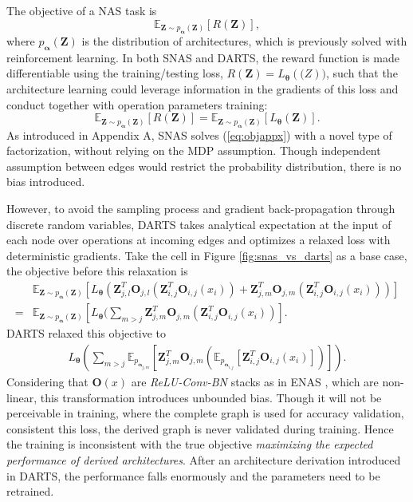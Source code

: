 \documentclass{article} \usepackage{iclr2019_conference,times}
\newcommand{\zh}{\color{black}}
\begin{document}
The objective of a NAS task is 
\begin{equation}
\label{eq:objappx}
\mathbb{E}_{\bm{Z}\sim p_{\bm{\alpha}}(\bm{Z})}[R(\bm{Z})], 
\end{equation}
where $p_{\bm{\alpha}}(\bm{Z})$ is the distribution of {\zh architectures}, which is previously solved with reinforcement learning. In both SNAS and DARTS, the reward function is made differentiable using the training/testing loss, $R(\bm{Z}) = L_{\bm{\theta}}(\bm(Z))$, such that the {\zh architecture} learning could leverage information in the gradients of this loss and conduct together with operation parameters training:
\begin{equation}
\mathbb{E}_{\bm{Z}\sim p_{\bm{\alpha}}(\bm{Z})}[R(\bm{Z})] = \mathbb{E}_{\bm{Z}\sim p_{\bm{\alpha}}(\bm{Z})}[L_{\bm{\theta}}(\bm{Z})].
\end{equation}
As introduced in Appendix A, SNAS solves (\ref{eq:objappx}) with a novel type of factorization, without relying on the MDP assumption. Though independent assumption between edges would restrict the probability distribution, there is no bias introduced. 

However, to avoid the sampling process and gradient back-propagation through discrete random variables, DARTS takes analytical expectation at the input of each node over operations at incoming edges and optimizes a relaxed loss with deterministic gradients. Take the cell in Figure \ref{fig:snas_vs_darts} as a base case, the objective before this relaxation is
\begin{equation}
\begin{split}
&\mathbb{E}_{\bm{Z}\sim p_{\bm{\alpha}}(\bm{Z})}[L_{\bm{\theta}}(\bm{Z}_{j,l}^{T}\bm{O}_{j,l}(\bm{Z}_{i,j}^{T}\bm{O}_{i,j}(x_{i}))+\bm{Z}_{j,m}^{T}\bm{O}_{j,m}(\bm{Z}_{i,j}^{T}\bm{O}_{i,j}(x_{i})))]\\
=& \mathbb{E}_{\bm{Z}\sim p_{\bm{\alpha}}(\bm{Z})}[L_{\bm{\theta}}(\sum_{m>j}\bm{Z}_{j,m}^{T}\bm{O}_{j,m}(\bm{Z}_{i,j}^{T}\bm{O}_{i,j}(x_{i}))]. 
\end{split}
\end{equation}
DARTS relaxed this objective to 
\begin{equation}
\begin{split}
L_{\bm{\theta}}(\sum_{m>j}\mathbb{E}_{p_{\bm{\alpha}_{j,m}}}[\bm{Z}_{j,m}^{T}\bm{O}_{j,m}(\mathbb{E}_{ p_{\bm{\alpha}_{i,j}}}[\bm{Z}_{i,j}^{T}\bm{O}_{i,j}(x_{i})])]). 
\end{split}
\end{equation}
{\zh Considering} that $\bm{O}(x)$ are \textit{ReLU-Conv-BN} stacks as in ENAS \citep{pham2018efficient}, which are non-linear, this transformation introduces unbounded bias. Though it will not be perceivable in training, where the complete graph is used for accuracy validation, consistent this loss, the derived graph is never validated during training. Hence the training is inconsistent with the true objective \textit{maximizing the expected {\zh performance} of derived {\zh architectures}}. After an {\zh architecture} derivation introduced in DARTS, the performance falls enormously and the parameters need to be retrained.
\end{document}
